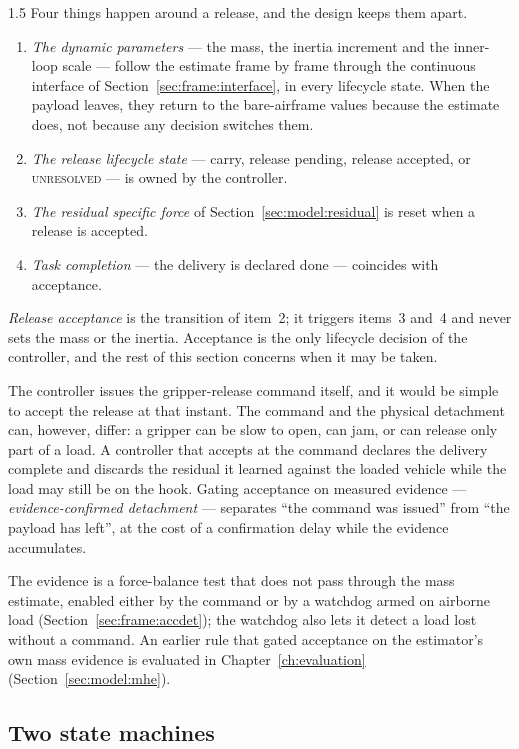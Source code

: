 \begin{spacing}{1.5}
Four things happen around a release, and the design keeps them apart.
\begin{enumerate}
\item \emph{The dynamic parameters} --- the mass, the inertia increment and the
inner-loop scale --- follow the estimate frame by frame through the continuous
interface of Section~\ref{sec:frame:interface}, in every lifecycle state. When
the payload leaves, they return to the bare-airframe values because the estimate
does, not because any decision switches them.
\item \emph{The release lifecycle state} --- carry, release pending, release
accepted, or \textsc{unresolved} --- is owned by the controller.
\item \emph{The residual specific force} of Section~\ref{sec:model:residual} is
reset when a release is accepted.
\item \emph{Task completion} --- the delivery is declared done --- coincides with
acceptance.
\end{enumerate}
\emph{Release acceptance} is the transition of item~2; it triggers items~3 and~4
and never sets the mass or the inertia. Acceptance is the only lifecycle decision
of the controller, and the rest of this section concerns when it may be taken.

The controller issues the gripper-release command itself, and it would be simple
to accept the release at that instant. The command and the physical detachment
can, however, differ: a gripper can be slow to open, can jam, or can release only
part of a load. A controller that accepts at the command declares the delivery
complete and discards the residual it learned against the loaded vehicle while
the load may still be on the hook. Gating acceptance on measured evidence ---
\emph{evidence-confirmed detachment} --- separates ``the command was issued''
from ``the payload has left'', at the cost of a confirmation delay while the
evidence accumulates.

The evidence is a force-balance test that does not pass through the mass
estimate, enabled either by the command or by a watchdog armed on airborne load
(Section~\ref{sec:frame:accdet}); the watchdog also lets it detect a load lost
without a command. An earlier rule that gated acceptance on the estimator's own
mass evidence is evaluated in Chapter~\ref{ch:evaluation}
(Section~\ref{sec:model:mhe}).

\subsection{Two state machines}\label{sec:frame:fsm}


\end{spacing}
